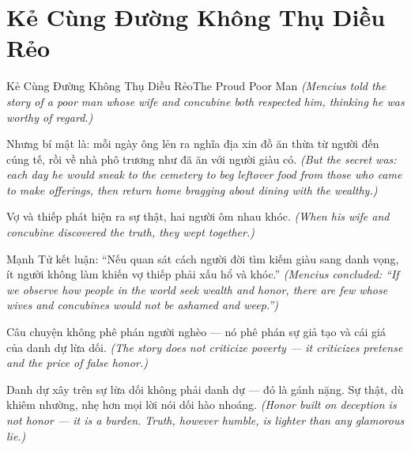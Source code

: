 \section{Kẻ Cùng Đường Không Thụ Diều Rẻo}
\begin{truyen}{Kẻ Cùng Đường Không Thụ Diều Rẻo}{The Proud Poor Man}
\textit{(Mencius told the story of a poor man whose wife and concubine both respected him, thinking he was worthy of regard.)}

Nhưng bí mật là: mỗi ngày ông lẻn ra nghĩa địa xin đồ ăn thừa từ người đến cúng tế, rồi về nhà phô trương như đã ăn với người giàu có.
\textit{(But the secret was: each day he would sneak to the cemetery to beg leftover food from those who came to make offerings, then return home bragging about dining with the wealthy.)}

Vợ và thiếp phát hiện ra sự thật, hai người ôm nhau khóc.
\textit{(When his wife and concubine discovered the truth, they wept together.)}

Mạnh Tử kết luận: ``Nếu quan sát cách người đời tìm kiếm giàu sang danh vọng, ít người không làm khiến vợ thiếp phải xấu hổ và khóc.''
\textit{(Mencius concluded: ``If we observe how people in the world seek wealth and honor, there are few whose wives and concubines would not be ashamed and weep.'')}

Câu chuyện không phê phán người nghèo — nó phê phán sự giả tạo và cái giá của danh dự lừa dối.
\textit{(The story does not criticize poverty — it criticizes pretense and the price of false honor.)}

\end{truyen}

\begin{baihoc}
Danh dự xây trên sự lừa dối không phải danh dự — đó là gánh nặng. Sự thật, dù khiêm nhường, nhẹ hơn mọi lời nói dối hào nhoáng.
\textit{(Honor built on deception is not honor — it is a burden. Truth, however humble, is lighter than any glamorous lie.)}
\end{baihoc}
\ngancach

